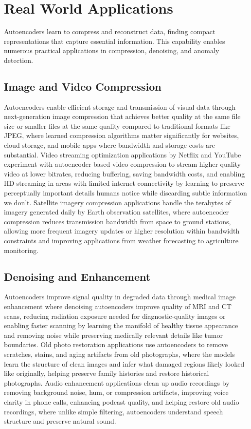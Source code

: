 
\section{Real World Applications}
\label{sec:autoencoder-real-world}


Autoencoders learn to compress and reconstruct data, finding compact representations that capture essential information. This capability enables numerous practical applications in compression, denoising, and anomaly detection.

\subsection{Image and Video Compression}

Autoencoders enable efficient storage and transmission of visual data through next-generation image compression that achieves better quality at the same file size or smaller files at the same quality compared to traditional formats like JPEG, where learned compression algorithms matter significantly for websites, cloud storage, and mobile apps where bandwidth and storage costs are substantial. Video streaming optimization applications by Netflix and YouTube experiment with autoencoder-based video compression to stream higher quality video at lower bitrates, reducing buffering, saving bandwidth costs, and enabling HD streaming in areas with limited internet connectivity by learning to preserve perceptually important details humans notice while discarding subtle information we don't. Satellite imagery compression applications handle the terabytes of imagery generated daily by Earth observation satellites, where autoencoder compression reduces transmission bandwidth from space to ground stations, allowing more frequent imagery updates or higher resolution within bandwidth constraints and improving applications from weather forecasting to agriculture monitoring.

\subsection{Denoising and Enhancement}

Autoencoders improve signal quality in degraded data through medical image enhancement where denoising autoencoders improve quality of MRI and CT scans, reducing radiation exposure needed for diagnostic-quality images or enabling faster scanning by learning the manifold of healthy tissue appearance and removing noise while preserving medically relevant details like tumor boundaries. Old photo restoration applications use autoencoders to remove scratches, stains, and aging artifacts from old photographs, where the models learn the structure of clean images and infer what damaged regions likely looked like originally, helping preserve family histories and restore historical photographs. Audio enhancement applications clean up audio recordings by removing background noise, hum, or compression artifacts, improving voice clarity in phone calls, enhancing podcast quality, and helping restore old audio recordings, where unlike simple filtering, autoencoders understand speech structure and preserve natural sound.

